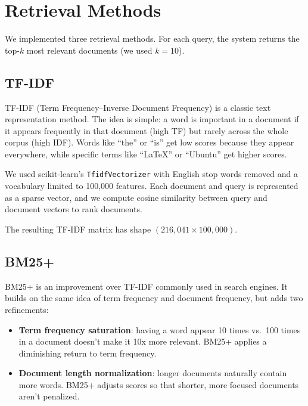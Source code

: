 \documentclass[12pt,a4paper]{article}
\begin{document}
\section{Retrieval Methods}

We implemented three retrieval methods. For each query, the system returns the top-$k$ most relevant documents (we used $k=10$).

\subsection{TF-IDF}

TF-IDF (Term Frequency--Inverse Document Frequency) is a classic text representation method. The idea is simple: a word is important in a document if it appears frequently in that document (high TF) but rarely across the whole corpus (high IDF). Words like ``the'' or ``is'' get low scores because they appear everywhere, while specific terms like ``LaTeX'' or ``Ubuntu'' get higher scores.

We used scikit-learn's \texttt{TfidfVectorizer} with English stop words removed and a vocabulary limited to 100,000 features. Each document and query is represented as a sparse vector, and we compute cosine similarity between query and document vectors to rank documents.

The resulting TF-IDF matrix has shape $(216{,}041 \times 100{,}000)$.

\subsection{BM25+}

BM25+ is an improvement over TF-IDF commonly used in search engines. It builds on the same idea of term frequency and document frequency, but adds two refinements:

\begin{itemize}
    \item \textbf{Term frequency saturation}: having a word appear 10 times vs.\ 100 times in a document doesn't make it 10x more relevant. BM25+ applies a diminishing return to term frequency.
    \item \textbf{Document length normalization}: longer documents naturally contain more words. BM25+ adjusts scores so that shorter, more focused documents aren't penalized.
\end{itemize}
\end{document}
